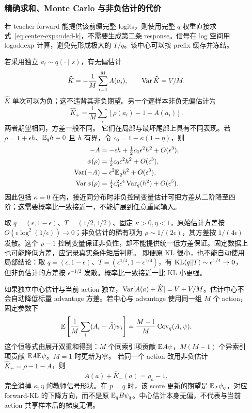 \subsubsection{精确求和、Monte Carlo 与非负估计的代价}

若 teacher forward 能提供该前缀完整 logits，则使用完整 $q$ 权重直接求式~\eqref{eq:center-expanded-k}，不需要生成第二条 response。信号在 log 空间用 logaddexp 计算，避免先形成极大的 $T/q$。该中心可以按 prefix 缓存并冻结。

若采用独立 $a_i\sim q(\cdot\mid s)$，有无偏估计
\begin{equation}
 \widehat K=-\frac1M\sum_{i=1}^MA(a_i),\qquad
 \operatorname{Var}\widehat K=V/M.
\end{equation}
$\widehat K$ 单次可以为负；这不违背其非负期望。另一个逐样本非负无偏估计为
\begin{equation}
 \widehat K_+=\frac1M\sum_i[\rho(a_i)-1-A(a_i)].
\end{equation}
两者期望相同，方差一般不同。 它们在局部与最坏尾部上具有不同表现。若 $\rho=1+\epsilon h$、$\mathbb E_qh=0$ 且 $h$ 有界，令 $c_0=1-\kappa(1-\eta)$，则
\begin{align}
 -A&=-\epsilon h+\tfrac12c_0\epsilon^2h^2+O(\epsilon^3),\\
 \phi(\rho)&=\tfrac12c_0\epsilon^2h^2+O(\epsilon^3),\\
 \operatorname{Var}(-A)&=\epsilon^2\mathbb E_qh^2+O(\epsilon^3),\\
 \operatorname{Var}\phi(\rho)&=\tfrac14c_0^2\epsilon^4\operatorname{Var}_q(h^2)+O(\epsilon^5).
\end{align}
因此包括 $\kappa=0$ 在内，接近同分布时非负控制变量估计可把方差从二阶降至四阶；这需要概率比一致接近一，不能扩展到任意重尾输入。

取 $q=(\epsilon,1-\epsilon)$、$T=(1/2,1/2)$、固定 $\kappa>0,\eta<1$，原始估计方差按 $O(\epsilon\log^2(1/\epsilon))\to0$；非负估计的稀有项为 $\rho\sim1/(2\epsilon)$，其方差按 $1/(4\epsilon)$ 发散。这个 $\rho-1$ 控制变量保证非负性，却不能提供统一低方差保证。固定数据上也可能降低方差，应记录真实条件矩后判断。 即便原 KL 很小，也不能自动使用局部结论：取 $q=(\epsilon,1-\epsilon)$、$T=(\epsilon^{1/4},1-\epsilon^{1/4})$，有 $\operatorname{KL}(q\Vert T)\sim\epsilon^{1/4}\to0$，但非负估计的方差按 $\epsilon^{-1/2}$ 发散。概率比一致接近一比 KL 小更强。

如果独立中心估计与当前 action 独立，$\operatorname{Var}[A(a)+\widehat K]=V+V/M$。估计中心不会自动降低标量 advantage 方差。若中心与 advantage 使用同一组 $M$ 个 action，固定参数下
\begin{equation}
 \mathbb E\left[\frac1M\sum_i(A_i-\bar A)\psi_i\right]
 =\frac{M-1}{M}\operatorname{Cov}_q(A,\psi).
\end{equation}
这个恒等式由展开双重和得到：$M$ 个同索引项贡献 $\mathbb E A\psi$，$M(M-1)$ 个异索引项贡献 $\mathbb E A\mathbb E\psi$。$M=1$ 时更新为零。 若同一个 action 改用非负估计 $\widehat K_+=\rho-1-A$，则
\begin{equation}
 A(a)+\widehat K_+(a)=\rho_a-1,
\end{equation}
完全消掉 $\kappa,\eta$ 的教师信号形状。在 $p=q$ 时，该 score 更新的期望是 $\mathbb E_T\psi_q$，对应 forward-KL 的下降方向，而不是原 $\mathbb E_qB\psi_q$。中心估计本身无偏，不代表与当前 action 共享样本后的梯度无偏。

